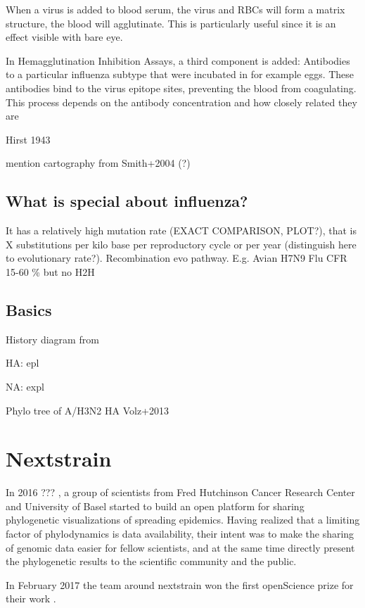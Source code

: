 \documentclass[12pt]{scrartcl}
\begin{document}
    When a virus is added to blood serum, the virus and RBCs will form a matrix structure, the blood will agglutinate. This is particularly useful since it is an effect visible with bare eye.

    In Hemagglutination Inhibition Assays, a third component is added: Antibodies to a particular influenza subtype that were incubated in for example eggs. These antibodies bind to the virus epitope sites, preventing the blood from coagulating. This process depends on the antibody concentration and how closely related they are

    Hirst 1943

    mention cartography from Smith+2004 (?) 

  \subsection{What is special about influenza?}

    It has a relatively high mutation rate (EXACT COMPARISON, PLOT?), that is X substitutions per kilo base per reproductory cycle or per year (distinguish here to evolutionary rate?). 
    Recombination evo pathway. E.g. Avian H7N9 Flu CFR 15-60 \% but no H2H


  \subsection{Basics}

    History diagram from \citep{alberts15}

    HA: epl

    NA: expl

    Phylo tree of A/H3N2 HA Volz+2013


\section{Nextstrain} \label{nextstrain}

  In 2016 ??? , a group of scientists from Fred Hutchinson Cancer Research Center and University of Basel started to build an open platform for sharing phylogenetic visualizations of spreading epidemics. Having realized that a limiting factor of phylodynamics is data availability, their intent was to make the sharing of genomic data easier for fellow scientists, and at the same time directly present the phylogenetic results to the scientific community and the public.

  In February 2017 the team around nextstrain won the first \gls{openScience} prize for their work \cite{hudson17}.
\end{document}
